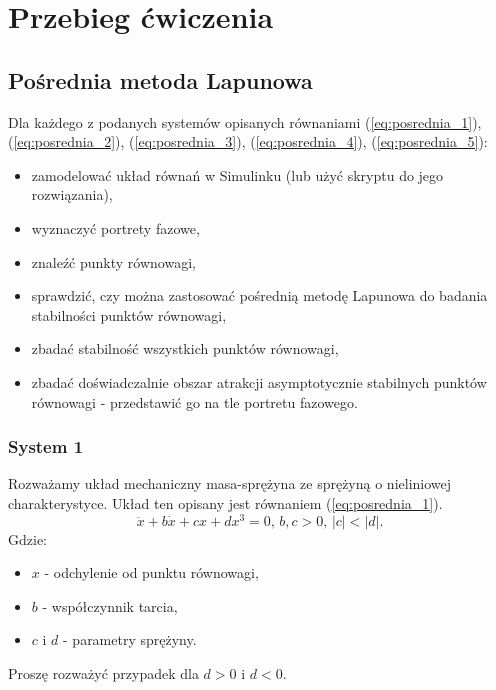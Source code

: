 \documentclass{article}
\begin{document}
\section{Przebieg ćwiczenia}
    \subsection{Pośrednia metoda Lapunowa}
    Dla każdego z podanych systemów opisanych równaniami (\ref{eq:posrednia_1}), (\ref{eq:posrednia_2}), (\ref{eq:posrednia_3}),  (\ref{eq:posrednia_4}),  (\ref{eq:posrednia_5}):
    \begin{itemize}
        \item zamodelować układ równań w Simulinku (lub użyć skryptu do jego rozwiązania),
        \item wyznaczyć portrety fazowe,
        \item znaleźć punkty równowagi,
        \item sprawdzić, czy można zastosować pośrednią metodę Lapunowa do badania stabilności punktów równowagi,
        \item zbadać stabilność wszystkich punktów równowagi,
        \item zbadać doświadczalnie obszar atrakcji asymptotycznie stabilnych punktów równowagi - przedstawić go na tle portretu fazowego.
    \end{itemize}
        \subsubsection{System 1}
        Rozważamy układ mechaniczny masa-sprężyna ze sprężyną o nieliniowej charakterystyce.
        Układ ten opisany jest równaniem (\ref{eq:posrednia_1}).
        \begin{equation}\label{eq:posrednia_1}
            \ddot{x} + b\dot{x} + cx + dx^{3} = 0, \, b,c > 0,\, |c|<|d|.
        \end{equation}
        Gdzie:
        \begin{itemize}
            \item $x$ - odchylenie od punktu równowagi,
            \item $b$ - współczynnik tarcia,
            \item $c$ i $d$ - parametry sprężyny.
        \end{itemize}
        Proszę rozważyć przypadek dla $d>0$ i $d<0$.
\end{document}
